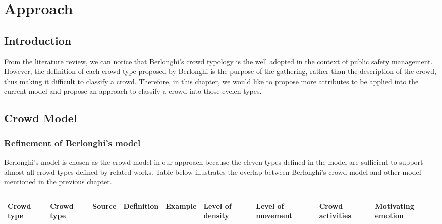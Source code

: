 \chapter{Approach}

\ifpdf
    \graphicspath{{Chapter3/Figs/Raster/}{Chapter3/Figs/PDF/}{Chapter3/Figs/}}
\else
    \graphicspath{{Chapter3/Figs/Vector/}{Chapter3/Figs/}}
\fi

\section{Introduction}
From the literature review, we can notice that Berlonghi's crowd typology is the well adopted in the context of public safety management. However, the definition of each crowd type proposed by Berlonghi is the purpose of the gathering, rather than the description of the crowd, thus making it difficult to classify a crowd. Therefore, in this chapter, we would like to propose more attributes to be applied into the current model and propose an approach to classify a crowd into those evelen types. 

\section{Crowd Model}

\subsection{Refinement of Berlonghi's model}
Berlonghi's model is chosen as the crowd model in our approach because the eleven types defined in the model are sufficient to support almost all crowd types defined by related works. Table below illustrates the overlap between Berlonghi's crowd model and other model mentioned in the previous chapter.

\begin{center}
	\begin{longtable}{|p{2cm}|p{2cm}|p{2cm}|p{2cm}|p{2cm}|p{2cm}|p{2cm}|p{2cm}|p{2cm}|}
	\caption{}
	\label{} \\
	\hline
	\textbf{Crowd type} & \textbf{Crowd type} & \textbf{Source} & \textbf{Definition} & \textbf{Example} & \textbf{Level of density} & \textbf{Level of movement} & \textbf{Crowd activities} & \textbf{Motivating emotion} \\
	\hline
	\end{longtable}
\end{center}

